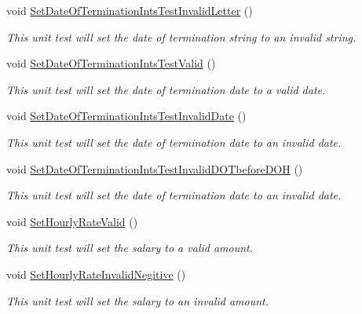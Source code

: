 \begin{DoxyCompactItemize}
void \hyperlink{class_my_all_employee_1_1_tests_1_1_parttime_employee_tests_aa445325458236a1781eccd8ada0c9f17}{Set\+Date\+Of\+Termination\+Ints\+Test\+Invalid\+Letter} ()
\begin{DoxyCompactList}\small\item\em This unit test will set the date of termination string to an invalid string. \end{DoxyCompactList}\item 
void \hyperlink{class_my_all_employee_1_1_tests_1_1_parttime_employee_tests_aa47717f8a375b5bcfb637d87bcc62160}{Set\+Date\+Of\+Termination\+Ints\+Test\+Valid} ()
\begin{DoxyCompactList}\small\item\em This unit test will set the date of termination date to a valid date. \end{DoxyCompactList}\item 
void \hyperlink{class_my_all_employee_1_1_tests_1_1_parttime_employee_tests_a422a5225128e49d11e33ee3e4292f779}{Set\+Date\+Of\+Termination\+Ints\+Test\+Invalid\+Date} ()
\begin{DoxyCompactList}\small\item\em This unit test will set the date of termination date to an invalid date. \end{DoxyCompactList}\item 
void \hyperlink{class_my_all_employee_1_1_tests_1_1_parttime_employee_tests_a6b600dc38b952b9ada8e31bea5528d3d}{Set\+Date\+Of\+Termination\+Ints\+Test\+Invalid\+D\+O\+Tbefore\+D\+O\+H} ()
\begin{DoxyCompactList}\small\item\em This unit test will set the date of termination date to an invalid date. \end{DoxyCompactList}\item 
void \hyperlink{class_my_all_employee_1_1_tests_1_1_parttime_employee_tests_a1a74fc5a6b0121238e98a8f79b167946}{Set\+Hourly\+Rate\+Valid} ()
\begin{DoxyCompactList}\small\item\em This unit test will set the salary to a valid amount. \end{DoxyCompactList}\item 
void \hyperlink{class_my_all_employee_1_1_tests_1_1_parttime_employee_tests_a6f28346f0b36854cfc4f9b4d6e00da83}{Set\+Hourly\+Rate\+Invalid\+Negitive} ()
\begin{DoxyCompactList}\small\item\em This unit test will set the salary to an invalid amount. \end{DoxyCompactList}\end{DoxyCompactItemize}


